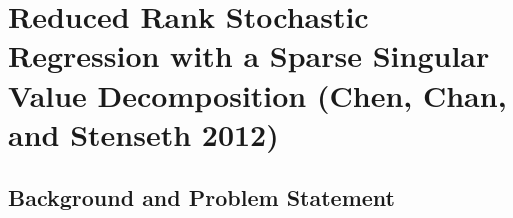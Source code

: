 \documentclass[notes]{beamer}       %
\begin{document}


\section{Reduced Rank Stochastic Regression with a Sparse Singular Value Decomposition (Chen, Chan, and Stenseth 2012)}

\subsection{Background and Problem Statement}
\end{document}
